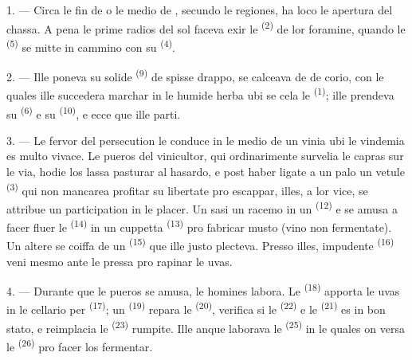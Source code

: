 \VUsaut{6.0mm}
\VUsaut{3.6mm}

\VUsaut{1.4mm}
\VUsaut{4.0mm}

1. --- Circa le fin de  o le medio de ,
secundo le regiones, ha loco le apertura del chassa. A pena le prime radios del
sol faceva exir le  \textsuperscript{(2)} de lor foramine,
quando le  \textsuperscript{(5)} se mitte in cammino con su
 \textsuperscript{(4)}.

2. --- Ille poneva su solide  \textsuperscript{(9)} de
spisse drappo, se calceava de  de corio, con le quales ille
succedera marchar in le humide herba ubi se cela le 
\textsuperscript{(1)}; ille prendeva su  \textsuperscript{(6)} e
su  \textsuperscript{(10)}, e ecce que ille parti.

3. --- Le fervor del persecution le conduce in le medio de un vinia ubi le
vindemia es multo vivace. Le pueros del vinicultor, qui ordinarimente survelia
le capras sur le via, hodie los lassa pasturar al hasardo, e post haber ligate a
un palo un vetule  \textsuperscript{(3)} qui non mancarea profitar
su libertate pro escappar, illes, a lor vice, se attribue un participation in
le placer. Un sasi un racemo in un 
\textsuperscript{(12)} e se amusa a facer fluer le 
\textsuperscript{(14)} in un cuppetta \textsuperscript{(13)} pro fabricar musto
(vino non fermentate). Un altere se coiffa de un 
\textsuperscript{(15)} que ille justo plecteva. Presso illes, impudente
 \textsuperscript{(16)} veni mesmo ante le pressa pro rapinar
le uvas.

4. --- Durante que le pueros se amusa, le homines labora. Le
 \textsuperscript{(18)} apporta le uvas in le cellario per
 \textsuperscript{(17)}; un 
\textsuperscript{(19)} repara le  \textsuperscript{(20)},
verifica si le  \textsuperscript{(22)} e le 
\textsuperscript{(21)} es in bon stato, e reimplacia le 
\textsuperscript{(23)} rumpite. Ille anque laborava le 
\textsuperscript{(25)} in le quales on versa le 
\textsuperscript{(26)} pro facer los fermentar.

